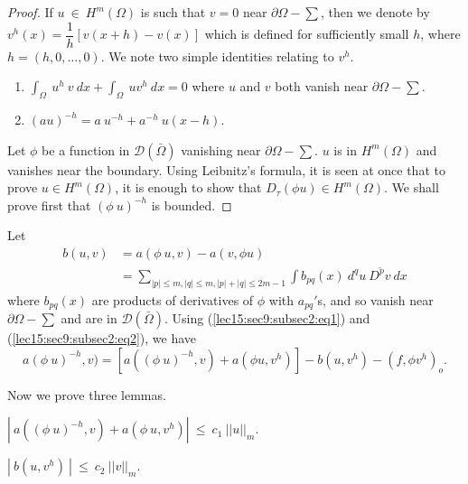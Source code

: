 \begin{proof}%
  If $u ~ \in ~ H^m(\Omega)$ is such that $v = 0$ near
  $\partial \Omega - \sum$, then we denote by $v^h(x) =
  \dfrac{1}{h}[v(x+h)- v(x)]$ which is defined for sufficiently small
  $h$, where $h = (h,0,\ldots,0)$. We note two simple identities
  relating to $v^h$. 
  \begin{enumerate}
  \item $\int_\Omega ~ u^h ~ v ~ dx + \int_\Omega ~ u v^h ~ dx = 0$
    where $u$ and $v$ both vanish near $\partial \Omega - \sum$. 
  \item $(au)^{-h} = a ~ u^{-h} + a^{-h} ~ u(x-h)$.
  \end{enumerate}

  Let $\phi$ be a function in $\mathscr{D}(\bar{\Omega})$ vanishing near
  $\partial\Omega - \sum$. $u$ is in $H^m(\Omega)$ and vanishes near the
  boundary. Using Leibnitz's formula, it is seen at once that to prove
  $u  \in  H^m(\Omega)$, it is enough to show that $D_\tau (\phi  u) 
  \in  H^m (\Omega)$. We shall prove first that $(\phi ~
  u)^{-h}$ is bounded. 
\end{proof}

Let\pageoriginale
\begin{align*}
  b(u,v) &  = a(\phi ~ u,v) - a(v,\phi u)\\
  & = \sum_{|p| \le  m, |q|  \le  m,  |p|+|q|  \le 2m-1} \int
  b_{pq} (x) ~ d^q u ~ \overline{D^p v} ~ dx \tag{2}\label{lec15:sec9:subsec2:eq2} 
\end{align*}
where $b_{pq}(x)$ are products of derivatives of $\phi$ with
$a_{pq}'$s, and so vanish near $\partial \Omega - \sum$ and are in
$\mathscr{D}(\bar{\Omega})$. Using (\ref{lec15:sec9:subsec2:eq1}) and (\ref{lec15:sec9:subsec2:eq2}), we have  
\begin{equation}
  a(\phi ~ u)^{-h},v) = [a((\phi ~ u)^{-h}, v) + a(\phi u , v^h)] -
  b(u,v^h) - (f,\phi v^h)_o. \tag{3}\label{lec15:sec9:subsec2:eq3} 
\end{equation} 

Now we prove three lemmas.
\begin{lemma}\label{lec15:sec9:subsec2:lem9.1}%
  $| ~ a((\phi ~ u)^{-h}, v) + a(\phi ~ u,v^h) | ~ \le ~ c_1 ~ || u ||_m$.
\end{lemma}

\begin{lemma}\label{lec15:sec9:subsec2:lem9.2} %
  $| ~ b(u,v^h) ~ | ~ \le ~ c_2 ~ || v ||_m$.
\end{lemma}

